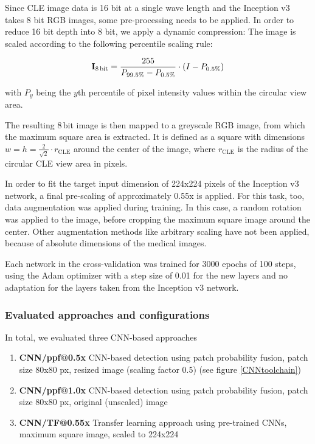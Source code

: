 \documentclass[fleqn,10pt]{wlscirep}
\begin{document}
Since CLE image data is 16 bit at a single wave length and the Inception v3 takes 8 bit RGB images, some pre-processing needs to be applied.
In order to reduce 16 bit depth into 8 bit, we apply a dynamic compression: The image is scaled according to the following percentile scaling rule:

$$ \mathbf{I}_\textrm{8\,bit} = \frac{255}{\mathit{P}_{99.5\%} - \mathit{P}_{0.5\%}} \cdot (I-P_{0.5\%})$$

with $\mathit{P}_y$ being the $y$th percentile of pixel intensity values within the circular view area.

The resulting 8\,bit image is then mapped to a greyscale RGB image, from which the maximum square area is extracted. It is defined as a square with dimensions $w=h=\frac{2}{\sqrt{2}} \cdot r_\mathrm{CLE}$ around the
center of the image, where
$r_\mathrm{CLE}$ is the radius of the circular CLE view area in pixels.

In order to fit the target input dimension of 224x224 pixels of the Inception v3 network, a final pre-scaling of approximately 0.55x is applied. For this task, too, data augmentation was applied during training. In this case, a random rotation was applied to the image, before cropping the maximum square image around the center. Other augmentation methods like arbitrary scaling have not been applied, because of absolute dimensions of the medical images.

Each network in the cross-validation was trained for 3000 epochs of 100 steps, using the Adam optimizer with a step size of 0.01 for the new layers and no adaptation for the layers taken from the Inception v3 network.


\subsubsection*{Evaluated approaches and configurations}

In total, we evaluated three CNN-based approaches
\begin{enumerate}
\item \textbf{CNN/ppf@0.5x} CNN-based detection using patch
  probability fusion, patch size 80x80 px, resized image (scaling factor 0.5) (see figure
  \ref{CNNtoolchain})
\item \textbf{CNN/ppf@1.0x} CNN-based detection using patch
  probability fusion, patch size 80x80 px, original
  (unscaled) image
\item \textbf{CNN/TF@0.55x} Transfer learning approach using pre-trained CNNs, maximum square image, scaled to 224x224
\end{enumerate}
\end{document}
